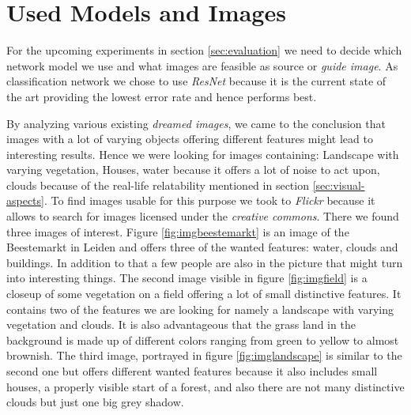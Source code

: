 \section{Used Models and Images}
\label{sec:data}
For the upcoming experiments in section \ref{sec:evaluation} we need to decide which network model we use and what images are feasible as source or \emph{guide image}.
As classification network we chose to use \emph{ResNet} because it is the current state of the art providing the lowest error rate and hence performs best.\cite{cnnComparison}

By analyzing various existing \emph{dreamed images}, we came to the conclusion that images with a lot of varying objects offering different features might lead to interesting results.
Hence we were looking for images containing: Landscape with varying vegetation, Houses, water because it offers a lot of noise to act upon, clouds because of the real-life relatability mentioned in section \ref{sec:visual-aspects}.
To find images usable for this purpose we took to \emph{Flickr} because it allows to search for images licensed under the \emph{creative commons}.
There we found three images of interest. Figure \ref{fig:imgbeestemarkt} is an image of the Beestemarkt in Leiden and offers three of the wanted features: water, clouds and buildings.
In addition to that a few people are also in the picture that might turn into interesting things.
The second image visible in figure \ref{fig:imgfield} is a closeup of some vegetation on a field offering a lot of small distinctive features. It contains two of the features we are looking for namely a landscape with varying vegetation and clouds. It is also advantageous that the grass land in the background is made up of different colors ranging from green to yellow to almost brownish.
The third image, portrayed in figure \ref{fig:imglandscape} is similar to the second one but offers different wanted features because it also includes small houses, a properly visible start of a forest, and also there are not many distinctive clouds but just one big grey shadow.


